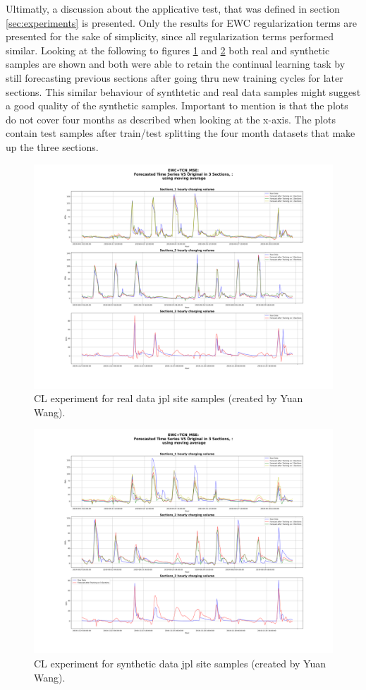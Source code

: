 Ultimatly, a discussion about the applicative test, that was defined in section \ref{sec:experiments} is presented. Only the results for EWC regularization terms are presented for the sake of simplicity, since all regularization terms performed similar. Looking at the following to figures \ref{fig:real forecast} and \ref{fig:synth forecast} both real and synthetic samples are shown and both were able to retain the continual learning task by still forecasting previous sections after going thru new training cycles for later sections. This similar behaviour of synthtetic and real data samples might suggest a good quality of the synthetic samples. Important to mention is that the plots do not cover four months as described when looking at the x-axis. The plots contain test samples after train/test splitting the four month datasets that make up the three sections.
\begin{figure}[h!]
    \centering
    \includegraphics[width=.8\textwidth]{images/synthetic_real.png}
    \caption{CL experiment for real data jpl site samples (created by Yuan Wang).}
    \label{fig:real forecast}
\end{figure}
\begin{figure}[h!]
    \centering
    \includegraphics[width=.8\textwidth]{images/synthetic_forecast.png}
    \caption{CL experiment for synthetic data jpl site samples (created by Yuan Wang).}
    \label{fig:synth forecast}
\end{figure}